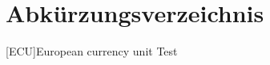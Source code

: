 \section*{Abkürzungsverzeichnis}
\label{sec:Abkürzungsverzeichnis}
\begin{acronym}
    [ECU]{European currency unit} Test
\end{acronym}